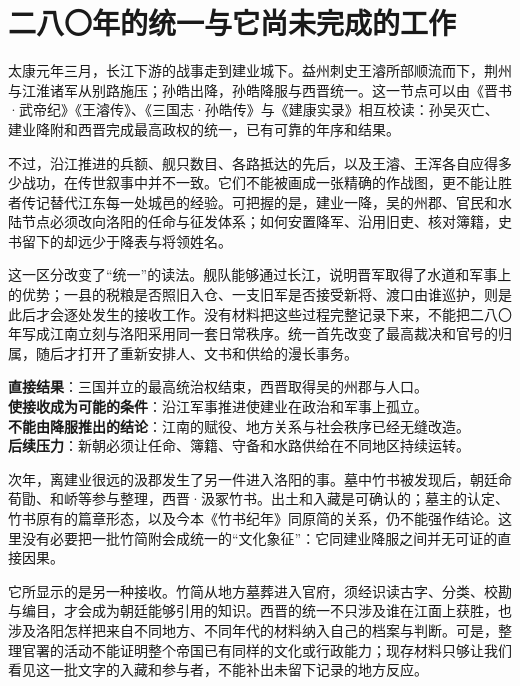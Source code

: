 \section{二八〇年的统一与它尚未完成的工作}
\label{sec:western-jin-unification-fracture}

太康元年三月，长江下游的战事走到建业城下。益州刺史王濬所部顺流而下，荆州与江淮诸军从别路施压；孙皓出降，\hypertarget{evt:TK-0280-SUN-HAO-SURRENDER}{\textcolor{dynasty}{孙皓降服与西晋统一}}。这一节点可以由《晋书·武帝纪》《王濬传》、《三国志·孙皓传》与《建康实录》相互校读：孙吴灭亡、建业降附和西晋完成最高政权的统一，已有可靠的年序和结果。

不过，沿江推进的兵额、舰只数目、各路抵达的先后，以及王濬、王浑各自应得多少战功，在传世叙事中并不一致。它们不能被画成一张精确的作战图，更不能让胜者传记替代江东每一处城邑的经验。可把握的是，建业一降，吴的州郡、官民和水陆节点必须改向洛阳的任命与征发体系；如何安置降军、沿用旧吏、核对簿籍，史书留下的却远少于降表与将领姓名。

这一区分改变了“统一”的读法。舰队能够通过长江，说明晋军取得了水道和军事上的优势；一县的税粮是否照旧入仓、一支旧军是否接受新将、渡口由谁巡护，则是此后才会逐处发生的接收工作。没有材料把这些过程完整记录下来，不能把二八〇年写成江南立刻与洛阳采用同一套日常秩序。统一首先改变了最高裁决和官号的归属，随后才打开了重新安排人、文书和供给的漫长事务。

\begin{causalchain}[建业降服所留下的工作]
\textbf{直接结果}：三国并立的最高统治权结束，西晋取得吴的州郡与人口。\\
\textbf{使接收成为可能的条件}：沿江军事推进使建业在政治和军事上孤立。\\
\textbf{不能由降服推出的结论}：江南的赋役、地方关系与社会秩序已经无缝改造。\\
\textbf{后续压力}：新朝必须让任命、簿籍、守备和水路供给在不同地区持续运转。
\end{causalchain}

次年，离建业很远的汲郡发生了另一件进入洛阳的事。墓中竹书被发现后，朝廷命荀勖、和峤等参与整理，\hypertarget{evt:JH-0281-JI-TOMB-BAMBOO}{\textcolor{dynasty}{西晋·汲冢竹书}}。出土和入藏是可确认的；墓主的认定、竹书原有的篇章形态，以及今本《竹书纪年》同原简的关系，仍不能强作结论。这里没有必要把一批竹简附会成统一的“文化象征”：它同建业降服之间并无可证的直接因果。

它所显示的是另一种接收。竹简从地方墓葬进入官府，须经识读古字、分类、校勘与编目，才会成为朝廷能够引用的知识。西晋的统一不只涉及谁在江面上获胜，也涉及洛阳怎样把来自不同地方、不同年代的材料纳入自己的档案与判断。可是，整理官署的活动不能证明整个帝国已有同样的文化或行政能力；现存材料只够让我们看见这一批文字的入藏和参与者，不能补出未留下记录的地方反应。

